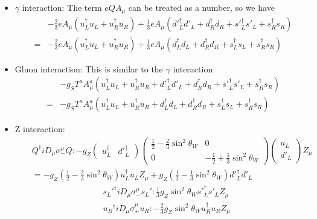 \documentclass[11pt]{article}
\begin{document}
\begin{itemize}
    \item $\gamma$ interaction: The term $e Q A_\mu$ can be treated as a number, so we have 
    \begin{eqnarray}
        &&-\frac{2}{3}eA_\mu(u_L^\dagger u_L+u_R^\dagger u_R)+\frac{1}{3}eA_\mu({d'}_L^\dagger d'_L+d_R^\dagger d_R +{s'}_L^\dagger s'_L+s_R^\dagger s_R) \\ 
        &=&-\frac{2}{3}eA_\mu(u_L^\dagger u_L+u_R^\dagger u_R)+\frac{1}{3}eA_\mu(d_L^\dagger d_L+d_R^\dagger d_R +s_L^\dagger s_L+s_R^\dagger s_R)
    \end{eqnarray}
    \item Gluon interaction: This is similar to the $\gamma$ interaction
    \begin{eqnarray}
        &&-g_ST^a A^a_\mu(u_L^\dagger u_L+u_R^\dagger u_R+{d'}_L^\dagger d'_L+d_R^\dagger d_R +{s'}_L^\dagger s'_L+s_R^\dagger s_R) \\ 
        &=&-g_ST^a A^a_\mu(u_L^\dagger u_L+u_R^\dagger u_R+d_L^\dagger d_L+d_R^\dagger d_R +s_L^\dagger s_L+s_R^\dagger s_R)
    \end{eqnarray}
    \item Z interaction: 
    \begin{eqnarray}
        &&Q^\dagger  iD_\mu \sigma_-^\mu Q  : -g_Z
        \begin{pmatrix}
            u_L^\dagger  & {d'}_L^\dagger 
        \end{pmatrix}
        \begin{pmatrix}
            \frac{1}{2}-\frac{2}{3} \sin^2\theta_W &0 \\ 
            0 & -\frac{1}{2}+\frac{1}{3} \sin^2\theta_W 
        \end{pmatrix}
        \begin{pmatrix}
            u_L \\ d'_L
        \end{pmatrix}
        Z_\mu\\
        &&=-g_Z (\frac{1}{2}-\frac{2}{3} \sin^2\theta_W ) u_L^\dagger u_L Z_\mu + g_Z(\frac{1}{2}-\frac{1}{3} \sin^2\theta_W){d'}_L^\dagger d'_L
    \end{eqnarray}
    \begin{eqnarray}
        && {s_L'}^\dagger iD_\mu \sigma_-^\mu s_L' : \frac{1}{3} g_Z \sin^2\theta_W {s'}_L^\dagger s'_L Z_\mu  \\
        && {u_R}^\dagger iD_\mu \sigma_+^\mu u_R : -\frac{2}{3} g_Z \sin^2\theta_W {u}_R^\dagger u_R Z_\mu \\

\end{eqnarray}
\end{itemize}
\end{document}
